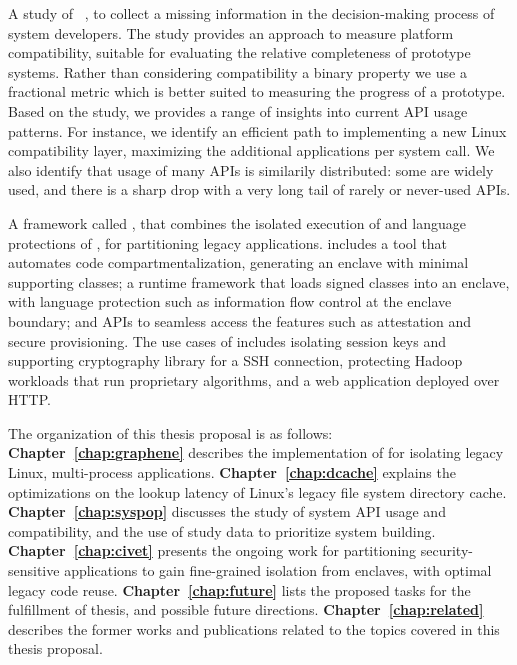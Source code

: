 \begin{compactitem}
\item
A study of ~\citep{tsai16apistudy}, to collect a missing information in
the decision-making process of system developers.
The study provides
an approach to measure platform compatibility, suitable for evaluating the relative completeness of prototype systems.
Rather than considering compatibility a binary property %
we use a fractional metric
which is better suited to measuring  the progress of a prototype.
Based on the study,
we provides a range of insights into current API usage patterns.
For instance, we identify an efficient path to implementing a new Linux compatibility layer, maximizing the additional applications per system call.
We also identify
that usage of many APIs is similarily distributed:
some are widely used, and there is a sharp drop with a very long tail
of rarely or never-used APIs.


\item
A framework called ,
that combines the isolated execution of \intel{} \sgx{} and
language protections of \java{},
for partitioning legacy \java{} applications.
\civet{} includes
a tool that automates code compartmentalization,
generating an enclave with minimal supporting \java{} classes;
a runtime framework that loads signed classes into an enclave,
with language protection such as information flow control at the enclave boundary;
and \java{} APIs to seamless access the \sgx{} features such
as attestation and secure provisioning.
The use cases of \civet{} includes
isolating session keys and supporting cryptography library for a SSH connection,
protecting Hadoop workloads that run proprietary algorithms,
and a web application deployed over HTTP.

\end{compactitem}




The organization of this thesis proposal is as follows:
{\bf Chapter~\ref{chap:graphene}} describes the implementation of \graphene{}\libos{} for isolating legacy Linux, multi-process applications.
{\bf Chapter~\ref{chap:dcache}} explains the optimizations on the lookup latency of
Linux's legacy file system directory cache.
{\bf Chapter~\ref{chap:syspop}} discusses the study of system API usage and compatibility,
and the use of study data to prioritize system building.
{\bf Chapter~\ref{chap:civet}} presents the ongoing work for partitioning security-sensitive
\java{} applications to gain fine-grained isolation from \intel{} \sgx{} enclaves,
with optimal legacy code reuse.
{\bf Chapter~\ref{chap:future}} lists the proposed tasks for the fulfillment of thesis,
and possible future directions.
{\bf Chapter~\ref{chap:related}} describes the former works and publications related to
the topics covered in this thesis proposal.
